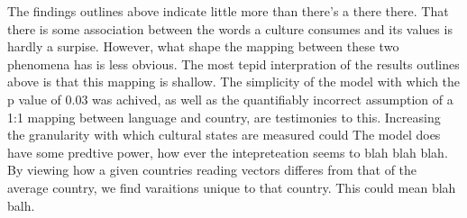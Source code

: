 The findings outlines above indicate little more than there's a there there.
That there is some association between the words a culture consumes and its values is hardly a surpise.
However, what shape the mapping between these two phenomena has is less obvious.
The most tepid interpration of the results outlines above is that this mapping is shallow.
The simplicity of the model with which the p value of 0.03 was achived, as well as the quantifiably
incorrect assumption of a 1:1 mapping between language and country, are testimonies to this.
Increasing the granularity with which cultural states are measured could 
The model does have some predtive power, how ever the intepreteation seems to blah blah blah. By viewing how a given countries reading vectors differes from that of the average country, we find varaitions unique to that country. This could mean blah balh.
